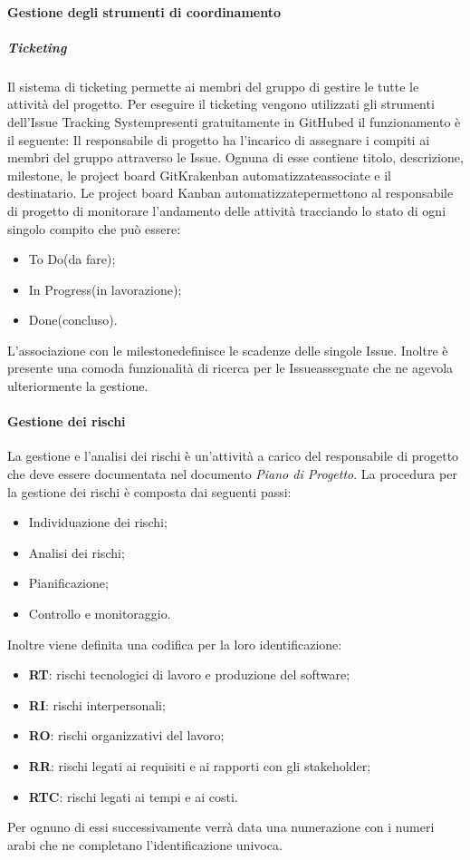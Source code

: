 			\paragraph{Gestione degli strumenti di coordinamento}
				\subparagraph*{Ticketing}
					Il sistema di ticketing permette ai membri del gruppo di gestire le tutte le attività del progetto.
					Per eseguire il ticketing vengono utilizzati gli strumenti dell'Issue Tracking System\glosp presenti gratuitamente in GitHub\glosp ed il funzionamento è il seguente:
					Il responsabile di progetto ha l'incarico di assegnare i compiti ai membri del gruppo attraverso le Issue\glosp. Ognuna di esse contiene titolo, descrizione,  milestone\glosp, le project board GitKrakenban automatizzate\glosp associate e il destinatario.
					Le project board Kanban automatizzate\glosp permettono al responsabile di progetto di monitorare l'andamento delle attività tracciando lo stato di ogni singolo compito che può essere:
					\begin{itemize}
						\item To Do(da fare);
						\item In Progress(in lavorazione);
						\item Done(concluso).
					\end{itemize}
					L'associazione con le milestone\glosp definisce le scadenze delle singole Issue\glosp.
					Inoltre è presente una comoda funzionalità di ricerca per le Issue\glosp assegnate che ne agevola ulteriormente la gestione.
			\paragraph{Gestione dei rischi}
				La gestione e l'analisi dei rischi è un'attività a carico del responsabile di progetto che deve essere documentata nel documento \textit{Piano di Progetto}.
				La procedura per la gestione dei rischi è composta dai seguenti passi:
				\begin{itemize}
					\item Individuazione dei rischi;
					\item Analisi dei rischi;
					\item Pianificazione;
					\item Controllo e monitoraggio.
				\end{itemize}
				Inoltre viene definita una codifica per la loro identificazione:
				\begin{itemize}
					\item \textbf{RT}: rischi tecnologici di lavoro e produzione del software;
					\item \textbf{RI}: rischi interpersonali;
					\item \textbf{RO}: rischi organizzativi del lavoro;
					\item \textbf{RR}: rischi legati ai requisiti e ai rapporti con gli stakeholder;
					\item \textbf{RTC}: rischi legati ai tempi e ai costi.
				\end{itemize}
				Per ognuno di essi successivamente verrà data una numerazione con i numeri arabi che ne completano l'identificazione univoca.
